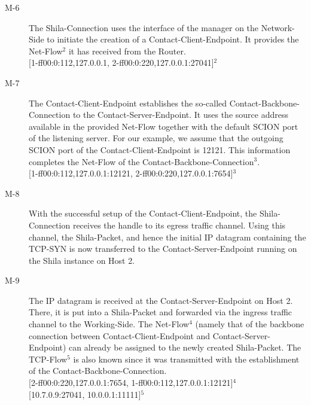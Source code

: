 \begin{description}
	\item[M-6] The Shila-Connection uses the interface of the manager on the Network-Side to initiate the creation of a Contact-Client-Endpoint. It provides the Net-Flow$^2$ it has received from the Router.\medskip\\{\small[1-ff00:0:112,127.0.0.1, 2-ff00:0:220,127.0.0.1:27041]$^2$}
	\item[M-7] The Contact-Client-Endpoint establishes the so-called Contact-Backbone-Connection to the Contact-Server-Endpoint. It uses the source address available in the provided Net-Flow together with the default SCION port of the listening server. For our example, we assume that the outgoing SCION port of the Contact-Client-Endpoint is 12121. This information completes the Net-Flow of the Contact-Backbone-Connection$^{3}$.\medskip\\{\small [1-ff00:0:112,127.0.0.1:12121, 2-ff00:0:220,127.0.0.1:7654]$^{3}$}
%	
%	
	\item[M-8] With the successful setup of the Contact-Client-Endpoint, the Shila-Connection receives the handle to its egress traffic channel. Using this channel, the Shila-Packet, and hence the initial IP datagram containing the TCP-SYN is now transferred to the Contact-Server-Endpoint running on the Shila instance on Host 2. %
	\item[M-9] The IP datagram is received at the Contact-Server-Endpoint on Host 2. There, it is put into a Shila-Packet and forwarded via the ingress traffic channel to the Working-Side. The Net-Flow$^{4}$ (namely that of the backbone connection between Contact-Client-Endpoint and Contact-Server-Endpoint) can already be assigned to the newly created Shila-Packet. The TCP-Flow$^{5}$ is also known since it was transmitted with the establishment of the Contact-Backbone-Connection.\medskip\\{\small [2-ff00:0:220,127.0.0.1:7654, 1-ff00:0:112,127.0.0.1:12121]$^{4}$}\\{\small [10.7.0.9:27041, 10.0.0.1:11111]$^{5}$} 

\end{description}
